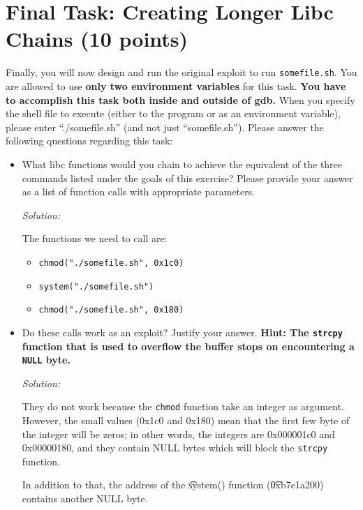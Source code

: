 \documentclass[a4paper,11pt]{article}
\newenvironment{solution}%
{\par{\noindent\small\textit{Solution:}}\vspace{-1ex}\begin{framed}}%
{\end{framed}\par}
\begin{document}
\section*{Final Task: Creating Longer Libc Chains (10 points)}

Finally, you will now design and run the original exploit to run
\texttt{somefile.sh}. You are allowed to use \textbf{only two environment
variables} for this task. \textbf{You have to accomplish this task both inside
and outside of gdb.}  When you specify the shell file to execute (either to the
program or as an environment variable), please enter ``./somefile.sh'' (and not
just ``somefile.sh''). Please answer the following questions regarding this
task:

\begin{itemize}
  \item What libc functions would you chain to achieve the equivalent of the
  three commands listed under the goals of this exercise? Please provide your
  answer as a list of function calls with appropriate parameters.

  \ifsolution
  \begin{solution}
	  The functions we need to call are:
	  \begin{itemize}
		  \item \texttt{chmod("./somefile.sh", 0x1c0)}
		  \item \texttt{system("./somefile.sh")}
		  \item \texttt{chmod("./somefile.sh", 0x180)}
	  \end{itemize}
\end{solution}
  \fi

  \item Do these calls work as an exploit? Justify your answer. \textbf{Hint:
  The \texttt{strcpy} function that is used to overflow the buffer stops on
  encountering a \texttt{NULL} byte.}

  \ifsolution
  \begin{solution}
	  They do not work because the \texttt{chmod} function take an integer as argument.
	  However, the small values (0x1c0 and 0x180) mean that the first few byte of the integer
	  will be zeros; in other words, the integers are 0x000001c0 and 0x00000180, and they
	  contain NULL bytes which will block the \texttt{strcpy} function.

	  In addition to that, the address of the \t{system()} function (\t{0xb7e1a200}) contains another NULL byte.
\end{solution}
  \fi


\end{itemize}
\end{document}
